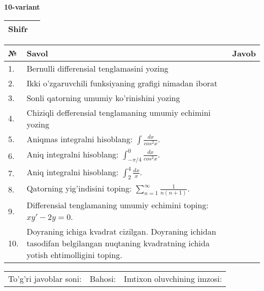 \documentclass{article}
\begin{document}
  \egroup
  
  \newpage
  
  
  \textbf{10-variant}\\
  
  \bgroup
  \def\arraystretch{1.6} %
  
  \begin{tabular}{|m{5.7cm}|m{9.5cm}|}
  \hline
  Shifr & \\
  \hline
  \end{tabular}
  
  \vspace{1cm}
  
  \begin{tabular}{|m{0.7cm}|m{10cm}|m{4cm}|}
  \hline
  № & Savol & Javob \\
  \hline
  1. & Bernulli differensial tenglamasini yozing &  \\
  \hline
  2. & Ikki o'zgaruvchili funksiyaning grafigi nimadan iborat &  \\
  \hline
  3. & Sonli qatorning umumiy ko'rinishini yozing &  \\
  \hline
  4. & Chiziqli defferensial tenglamaning umumiy echimini yozing &  \\
  \hline
  5. & Aniqmas integralni hisoblang: \(\int \frac{dx}{cos^{2}x}\). &  \\
  \hline
  6. & Aniq integralni hisoblang: \(\int_{- \pi/4}^{0}\frac{dx}{cos^{2}x}\). &  \\
  \hline
  7. & Aniq integralni hisoblang: \(\int_{2}^{4}\frac{dx}{x}\). &  \\
  \hline
  8. & Qatorning yig'indisini toping: \(\sum_{n = 1}^{\infty}\frac{1}{n(n + 1)}\). &  \\
  \hline
  9. & Differensial tenglamaning umumiy echimini toping: \(xy' - 2y = 0\). &  \\
  \hline
  10. & Doyraning ichiga kvadrat cizilgan. Doyraning ichidan tasodifan belgilangan nuqtaning kvadratning ichida yotish ehtimolligini toping. &  \\
  \hline
  \end{tabular}
  
  \vspace{1cm}
  
  \begin{tabular}{lll}
  To'g'ri javoblar soni: \underline{\hspace{1.5cm}} & 
  Bahosi: \underline{\hspace{1.5cm}} & 
  Imtixon oluvchining imzosi: \underline{\hspace{2cm}} \\
  \end{tabular}
  
\end{document}
